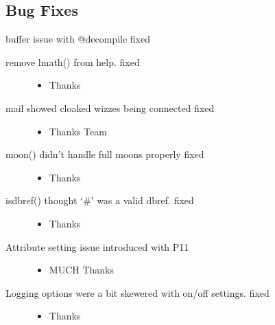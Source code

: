 \documentclass[letterpaper,10pt,english]{sphinxmanual}
\begin{document}
\subsection{Bug Fixes}
\label{\detokenize{changelog:id46}}
\sphinxAtStartPar
buffer issue with @decompile \sphinxhyphen{} fixed
\begin{description}
\item[{remove lmath() from help. \sphinxhyphen{} fixed}] \leavevmode\begin{itemize}
\item {} 
\sphinxAtStartPar
Thanks 

\end{itemize}

\item[{mail showed cloaked wizzes being connected \sphinxhyphen{} fixed}] \leavevmode\begin{itemize}
\item {} 
\sphinxAtStartPar
Thanks  Team

\end{itemize}

\item[{moon() didn’t handle full moons properly \sphinxhyphen{} fixed}] \leavevmode\begin{itemize}
\item {} 
\sphinxAtStartPar
Thanks 

\end{itemize}

\item[{isdbref() thought ‘\#’ was a valid dbref. \sphinxhyphen{} fixed}] \leavevmode\begin{itemize}
\item {} 
\sphinxAtStartPar
Thanks 

\end{itemize}

\item[{Attribute setting issue introduced with P11}] \leavevmode\begin{itemize}
\item {} 
\sphinxAtStartPar
MUCH Thanks 

\end{itemize}

\item[{Logging options were a bit skewered with on/off settings. \sphinxhyphen{} fixed}] \leavevmode\begin{itemize}
\item {} 
\sphinxAtStartPar
Thanks 

\end{itemize}

\end{description}
\end{document}
